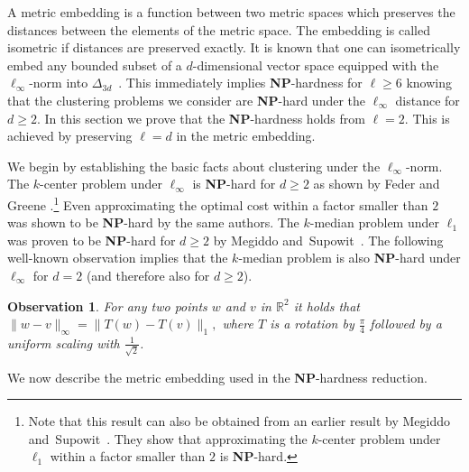 \documentclass[11pt, letter]{article}
\newtheorem{observation}[theorem]{Observation}
\newcommand{\NP}{\textbf{NP}} \newcommand{\spine}{\textsl{spine}}
\begin{document}
A metric embedding is a function between two metric spaces which preserves the
distances between the elements of the metric space. The embedding is called
isometric if distances are preserved exactly. 
It is known that one can isometrically embed any bounded subset of a
$d$-dimensional vector space equipped with the $\ell_{\infty}$-norm into
$\Delta_{3d}$~\cite{IndMat04}.
This immediately implies \NP-hardness for $\ell \geq 6 $ knowing that 
the clustering problems we consider are \NP-hard under the
$\ell_{\infty}$ distance for $d\geq 2$. In this section we prove that the \NP-hardness
holds from $\ell=2$. This is achieved by preserving $\ell=d$ in the
metric embedding. 

We begin by establishing the basic facts about clustering under the 
$\ell_{\infty}$-norm.
The $k$-center problem under $\ell_{\infty}$ is \NP-hard for $d \geq 2$ as shown
by Feder and Greene \cite{feder1988optimal}.\footnote{Note that this result can
also be obtained from an earlier result by Megiddo
and~Supowit~\cite{megiddo1984geo}. They show that approximating the $k$-center
problem under $\ell_1$ within a factor smaller than $2$ is \NP-hard.}
Even approximating the optimal cost within a factor smaller than $2$ was
shown to be \NP-hard by the same authors.
The $k$-median problem under $\ell_1$ was proven to be \NP-hard  for $d \geq 2$ by Megiddo
and~Supowit~\cite{megiddo1984geo}. The following well-known observation implies
that the $k$-median problem is also \NP-hard under $\ell_{\infty}$ for $d=2$ (and
therefore also for $d \geq 2$). 

\begin{observation}
For any two points $w$ and $v$ in $\mathbb{R}^2$ it holds that 
$\| w-v \|_{\infty} = {\| T(w)-T(v) \|_{1}},$
where $T$ is a rotation by $\frac{\pi}{4}$ followed by a uniform scaling with
$\frac{1}{\sqrt{2}}$.
\end{observation}


We now describe the metric embedding used in the \textbf{NP}-hardness reduction.
\end{document}
